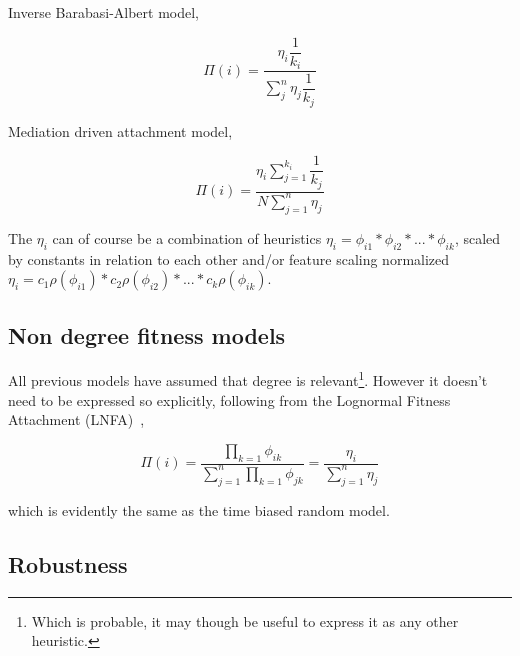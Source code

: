 Inverse Barabasi-Albert model,

\[ \Pi(i) =  \dfrac{\eta_i\dfrac{1}{k_i}}{\sum_{j}^{n}\eta_j \dfrac{1}{k_j}} \]

Mediation driven attachment model,

\[ \Pi(i) = \dfrac{\eta_i\sum_{j=1}^{k_i}\dfrac{1}{k_j}}{N\sum_{j=1}^{n}\eta_j} \]

The $\eta_i$ can of course be a combination of heuristics $\eta_i = \phi_{i1} * \phi_{i2} * ... * \phi_{ik}$, scaled by constants in relation to each other and/or feature scaling normalized $\eta_i = c_1\rho(\phi_{i1}) * c_2\rho(\phi_{i2}) * ... * c_k\rho(\phi_{ik})$.

\subsection{Non degree fitness models}

All previous models have assumed that degree is relevant\footnote{Which is probable, it may though be useful to express it as any other heuristic.}. However it doesn't need to be expressed so explicitly, following from the Lognormal  Fitness Attachment (LNFA)~\cite{bell:logonormal},

\[ \Pi(i) = \dfrac{\prod_{k=1}\phi_{ik}}{\sum_{j=1}^n\prod_{k=1} \phi_{jk}} = \dfrac{\eta_i}{\sum_{j=1}^{n} \eta_j} \]

which is evidently the same as the time biased random model. 

\subsection{Robustness}

